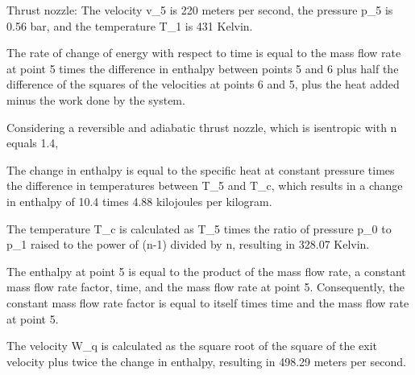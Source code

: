 Thrust nozzle:
The velocity v_5 is 220 meters per second, the pressure p_5 is 0.56 bar, and the temperature T_1 is 431 Kelvin.

The rate of change of energy with respect to time is equal to the mass flow rate at point 5 times the difference in enthalpy between points 5 and 6 plus half the difference of the squares of the velocities at points 6 and 5, plus the heat added minus the work done by the system.

Considering a reversible and adiabatic thrust nozzle, which is isentropic with n equals 1.4,

The change in enthalpy is equal to the specific heat at constant pressure times the difference in temperatures between T_5 and T_c, which results in a change in enthalpy of 10.4 times 4.88 kilojoules per kilogram.

The temperature T_c is calculated as T_5 times the ratio of pressure p_0 to p_1 raised to the power of (n-1) divided by n, resulting in 328.07 Kelvin.

The enthalpy at point 5 is equal to the product of the mass flow rate, a constant mass flow rate factor, time, and the mass flow rate at point 5. Consequently, the constant mass flow rate factor is equal to itself times time and the mass flow rate at point 5.

The velocity W_q is calculated as the square root of the square of the exit velocity plus twice the change in enthalpy, resulting in 498.29 meters per second.